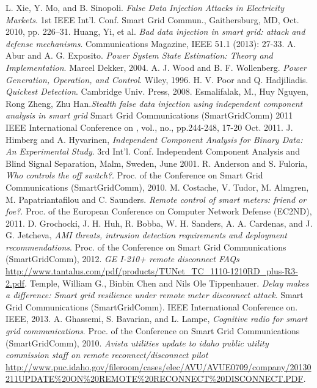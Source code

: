 \documentclass[11pt,oneside]{book}
\begin{document}
\begin{thebibliography}{99}
 L. Xie, Y. Mo, and B. Sinopoli. \emph{False Data Injection Attacks in Electricity Markets}. 1st IEEE Int’l. Conf. Smart Grid Commun., Gaithersburg, MD, Oct. 2010, pp. 226–31.
 Huang, Yi, et al. \emph{Bad data injection in smart grid: attack and defense mechanisms}. Communications Magazine, IEEE 51.1 (2013): 27-33.
 A. Abur and A. G. Exposito. \emph{Power System State Estimation: Theory and Implementation}. Marcel Dekker, 2004.
 A. J. Wood and B. F. Wollenberg. \emph{Power Generation, Operation, and Control}. Wiley, 1996.
 H. V. Poor and Q. Hadjiliadis. \emph{Quickest Detection}. Cambridge Univ. Press, 2008.
 Esmalifalak, M., Huy Nguyen, Rong Zheng, Zhu Han.\emph{Stealth false data injection using independent component analysis in smart grid} Smart Grid Communications (SmartGridComm) 2011 IEEE International Conference on , vol., no., pp.244-248, 17-20 Oct. 2011.
 J. Himberg and A. Hyvarinen, \emph{Independent Component Analysis for Binary Data: An Experimental Study}. 3rd Int’l. Conf. Independent Component Analysis and Blind Signal Separation, Malm, Sweden, June 2001.
 R. Anderson and S. Fuloria, \emph{Who controls the off switch?}. Proc. of the Conference on Smart Grid Communications (SmartGridComm), 2010.
 M. Costache, V. Tudor, M. Almgren, M. Papatriantafilou and C. Saunders. \emph{Remote control of smart meters: friend or foe?}. Proc. of the European Conference on Computer Network Defense (EC2ND), 2011.
 D. Grochocki, J. H. Huh, R. Bobba, W. H. Sanders, A. A. Cardenas, and J. G. Jetcheva, \emph{AMI threats, intrusion detection requirements and deployment recommendations}. Proc. of the Conference on Smart Grid Communications (SmartGridComm), 2012.
 \emph{GE I-210+ remote disconnect FAQs} \url{http://www.tantalus.com/pdf/products/TUNet_TC_1110-1210RD_plus-R3-2.pdf}.
 Temple, William G., Binbin Chen and Nils Ole Tippenhauer. \emph{Delay makes a difference: Smart grid resilience under remote meter disconnect attack}. Smart Grid Communications (SmartGridComm). IEEE International Conference on. IEEE, 2013.
 A. Ghassemi, S. Bavarian, and L. Lampe, \emph{Cognitive radio for smart grid communications}. Proc. of the Conference on Smart Grid Communications (SmartGridComm), 2010.
 \emph{Avista utilities update to idaho public utility commission staff on remote reconnect/disconnect pilot} \url{http://www.puc.idaho.gov/fileroom/cases/elec/AVU/AVUE0709/company/20130211UPDATE\%20ON\%20REMOTE\%20RECONNECT\%20DISCONNECT.PDF}.

\end{thebibliography}
\end{document}

